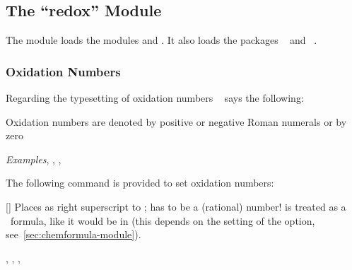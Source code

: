 \documentclass{chemmacros-manual}
\makeatletter
\def\chemmodule*#1{\textquotedblleft#1\textquotedblright}%
\renewenvironment{commands}
  {%
    \let\command\cnltx@command
    \let\explcommand\cnltx@explcommand
    \cnltxlist
  }
  {\endcnltxlist}
\makeatother
\begin{document}
\subsection{The \chemmodule*{redox} Module}\label{sec:redox-module}

The  module loads the modules  and
. It also loads the packages
~\cite{pkg:mathtools} and ~\cite{pkg:relsize}.

\subsubsection{Oxidation Numbers}\label{sec:oxidation-numbers}

Regarding the typesetting of oxidation numbers
~\cite{iupac:greenbook} says the following:
\begin{cnltxquote}
  Oxidation numbers are denoted by positive or negative Roman numerals or by
  zero \textelp{}

  \textit{Examples}\quad {}, , ,
\end{cnltxquote}

The following command is provided to set oxidation numbers:
\begin{commands}
  \command{ox}[\sarg{}]
    Places  as right superscript to ; 
    has to be a (rational) number!   is treated as a \chemformula\
    formula, like it would be in  (this depends on the setting of
    the \option{formula} option, see~\vref{sec:chemformula-module}).
\end{commands}

\begin{example}
  , , , 
\end{example}
\end{document}
